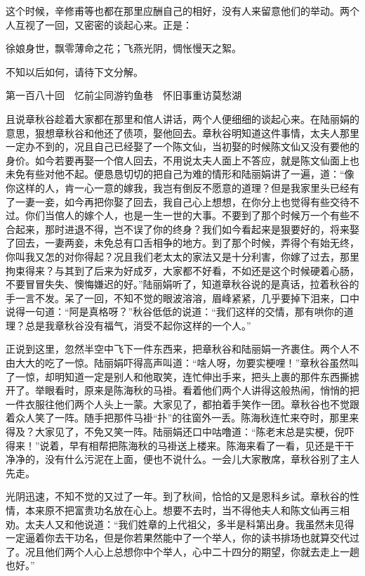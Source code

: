 \documentclass[12pt,UTF8]{ctexbook}
\begin{document}
{{{这个时候，辛修甫等也都在那里应酬自己的相好，没有人来留意他们的举动。两个人互视了一回，又密密的谈起心来。正是：

徐娘身世，飘零薄命之花；飞燕光阴，惆怅慢天之絮。

不知以后如何，请待下文分解。





第一百八十回　忆前尘同游钓鱼巷　怀旧事重访莫愁湖





且说章秋谷趁着大家都在那里和倌人讲话，两个人便细细的谈起心来。在陆丽娟的意思，狠想章秋谷和他还了债项，娶他回去。章秋谷明知道这件事情，太夫人那里一定办不到的，况且自己已经娶了一个陈文仙，当初娶的时候陈文仙又没有要他的身价。如今若要再娶一个倌人回去，不用说太夫人面上不答应，就是陈文仙面上也未免有些对他不起。便恳恳切切的把自己为难的情形和陆丽娟讲了一遍，道：“像你这样的人，肯一心一意的嫁我，我岂有倒反不愿意的道理？但是我家里头已经有了一妻一妾，如今再把你娶了回去，我自己心上想想，在你分上也觉得有些交待不过。你们当倌人的嫁个人，也是一生一世的大事。不要到了那个时候万一个有些不合起来，那时进退不得，岂不误了你的终身？我们如今看起来是狠要好的，将来娶了回去，一妻两妾，未免总有口舌相争的地方。到了那个时候，弄得个有始无终，你叫我又怎的对你得起？况且我们老太太的家法又是十分利害，你嫁了过去，那里拘束得来？与其到了后来为好成歹，大家都不好看，不如还是这个时候硬着心肠，不要冒冒失失、懊悔嫌迟的好。”陆丽娟听了，知道章秋谷说的是真话，拉着秋谷的手一言不发。呆了一回，不知不觉的眼波溶溶，眉峰紧紧，几乎要掉下泪来，口中说得一句道：“阿是真格呀？”秋谷低低的说道：“我们这样的交情，那有哄你的道理？总是我章秋谷没有福气，消受不起你这样的一个人。”

正说到这里，忽然半空中飞下一件东西来，把章秋谷和陆丽娟一齐裹住。两个人不由大大的吃了一惊。陆丽娟吓得高声叫道：“啥人呀，勿要实梗哩！”章秋谷虽然叫了一惊，却明知道一定是别人和他取笑，连忙伸出手来，把头上裹的那件东西撕掳开了。举眼看时，原来是陈海秋的马褂。看着他们两个人讲得这般热闹，悄悄的把一件衣服往他们两个人头上一蒙。大家见了，都拍着手笑作一团。章秋谷也不觉跟着众人笑了一阵。随手把那件马褂“扑”的往窗外一丢。陈海秋连忙来夺时，那里来得及？大家见了，不免又笑一阵。陆丽娟还口中咕噜道：“陈老末总是实梗，倪吓得来！”说着，早有相帮把陈海秋的马褂送上楼来。陈海来看了一看，见还是干干净净的，没有什么污泥在上面，便也不说什么。一会儿大家散席，章秋谷别了主人先走。

光阴迅速，不知不觉的又过了一年。到了秋间，恰恰的又是恩科乡试。章秋谷的性情，本来原不把富贵功名放在心上。想要不去时，当不得他夫人和陈文仙再三相劝。太夫人又和他说道：“我们姓章的上代祖父，多半是科第出身。我虽然未见得一定逼着你去干功名，但是你若果然能中了一个举人，你的读书排场也就算交代过了。况且他们两个人心上总想你中个举人，心中二十四分的期望，你就去走上一趟也好。”

}}}
\end{document}
